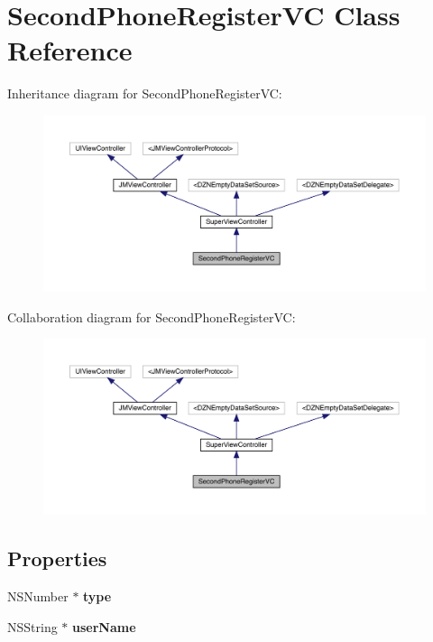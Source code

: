 \hypertarget{interface_second_phone_register_v_c}{}\section{Second\+Phone\+Register\+VC Class Reference}
\label{interface_second_phone_register_v_c}


Inheritance diagram for Second\+Phone\+Register\+VC\+:\nopagebreak
\begin{figure}[H]
\begin{center}
\leavevmode
\includegraphics[width=350pt]{interface_second_phone_register_v_c__inherit__graph}
\end{center}
\end{figure}


Collaboration diagram for Second\+Phone\+Register\+VC\+:\nopagebreak
\begin{figure}[H]
\begin{center}
\leavevmode
\includegraphics[width=350pt]{interface_second_phone_register_v_c__coll__graph}
\end{center}
\end{figure}
\subsection*{Properties}
\begin{DoxyCompactItemize}
\item 
\mbox{\label{interface_second_phone_register_v_c_aece8dbb3a6215d11738d1187e04d293f}} 
N\+S\+Number $\ast$ {\bfseries type}
\item 
\mbox{\label{interface_second_phone_register_v_c_a367ed6281cee52c5f0b4b6d5e2dd7c7b}} 
N\+S\+String $\ast$ {\bfseries user\+Name}
\end{DoxyCompactItemize}
